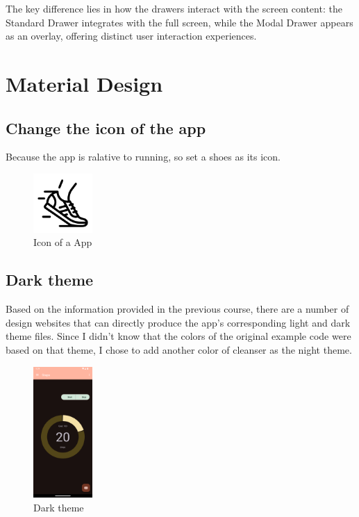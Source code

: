 \documentclass{article}
\begin{document}
The key difference lies in how the drawers interact with the screen content: the Standard Drawer integrates with the full screen, while the Modal Drawer appears as an overlay, offering distinct user interaction experiences.

\section{Material Design}
\subsection{Change the icon of the app}
Because the app is ralative to running, so set a shoes as its icon.

\begin{figure}[h]
    \centering
    \includegraphics[width=0.2\textwidth]{./pictures/running-shoes.png}
    \caption{Icon of a App}
    \label{fig:example}
\end{figure}

\subsection{Dark theme}
Based on the information provided in the previous course, there are a number of design websites that can directly produce the app's corresponding light and dark theme files. Since I didn't know that the colors of the original example code were based on that theme, I chose to add another color of cleanser as the night theme.
\begin{figure}[h]
    \centering
    \includegraphics[width=0.2\textwidth]{./pictures/darkTheme.png}
    \caption{Dark theme}
    \label{fig:example}
\end{figure}
\end{document}
